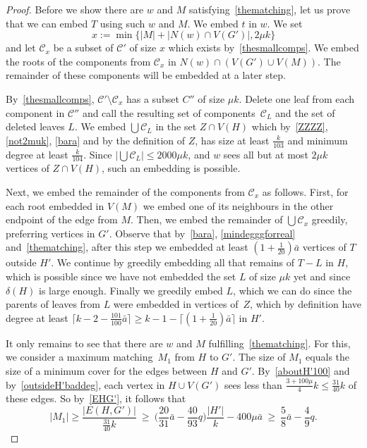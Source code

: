 \documentclass[10pt,a4paper]{amsart}
\begin{document}
\begin{proof}
         Before we show there are $w$ and $M$ satisfying~\eqref{thematching}, let us prove that we can embed $T$ using such $w$ and $M$.
         We embed $t$ in $w$. We set 
$$x:=\min\big\{|M|+|N(w)\cap V(G')|, 2\mu k\big\}$$ and let $\mathcal C_x$ be a subset of $\mathcal C'$ of size $x$ which exists by~\eqref{thesmallcomps}.
We embed 
 the roots of  the components  from $\mathcal C_x$ in $N(w) \cap (V(G')\cup V(M))$. The remainder of these components will be embedded at a later step.
 
By~\eqref{thesmallcomps}, $\mathcal C'\setminus\mathcal C_x$ has a subset $C''$ of size   $\mu k$. Delete one leaf from each  component in $\mathcal C''$ and call the resulting set of components~$\mathcal C_L$ and the set of deleted leaves $L$. 
We embed $\bigcup\mathcal C_L$   in the set $Z\cap V(H)$ which by~\eqref{ZZZZ}, \eqref{not2muk}, \eqref{bara} and by the definition of $Z$, has size at least $\frac k{103}$ and minimum degree at least $\frac{k}{104}$. 
Since  $|\bigcup\mathcal C_L|\le 2000\mu k$, and $w$ sees all but at most $2\mu k$ vertices of $Z\cap V(H)$, such an embedding is possible.

Next, we embed the remainder of the components  from $\mathcal C_x$ as follows. First, for each root embedded in $V(M)$ we embed one of its neighbours in the other endpoint of the edge from $M$. Then, we embed the remainder of  $\bigcup\mathcal C_x$ greedily, preferring vertices in $G'$. 
Observe that by~\eqref{bara}, \eqref{mindegggforreal} and~\eqref{thematching}, after this step
we embedded at least 
$(1+\frac{1}{20} )\bar a$
vertices of $T$ outside  $H'$.
We continue by 
 greedily embedding all that remains of $T-L$ in $H$, which is possible since we have not embedded the set $L$ of size $\mu k$ yet and since $\delta(H)$ is large enough. Finally we greedily embed  $L$, which we can do   since the parents of leaves from $L$ were embedded  in vertices of~$Z$, which by definition have degree at least $\lceil k-2-\frac{101}{100}\bar a\rceil \ge  k-1-\lceil(1+\frac{1}{20})\bar a\rceil$ in $H'$.



It only remains to see that there are $w$ and $M$ fulfilling~\eqref{thematching}. For this, we consider a maximum matching~$M_1$ from $H$ to $G'$. The size of $M_1$ equals the size of a minimum cover for the
edges  between $H$ and $G'$. By~\eqref{aboutH'100}  and by~\eqref{outsideH'baddeg}, each vertex in $H\cup V(G')$ sees less than  $\frac{3+100\mu}{4}k\le \frac{31}{40}k$ of these edges. So by~\eqref{EHG'}, it follows that 
$$|M_1|\ge \frac{|E(H,G')|}{ \frac{31}{40}k}\ \ge \
\Big( \frac{20}{31}\bar a  - \frac{40}{93} q \Big)\frac{|H'|}k- 400 \mu \bar a 
\ \ge\ \frac{5}{8} \bar a-\frac 49 q.$$


\end{proof}
\end{document}
